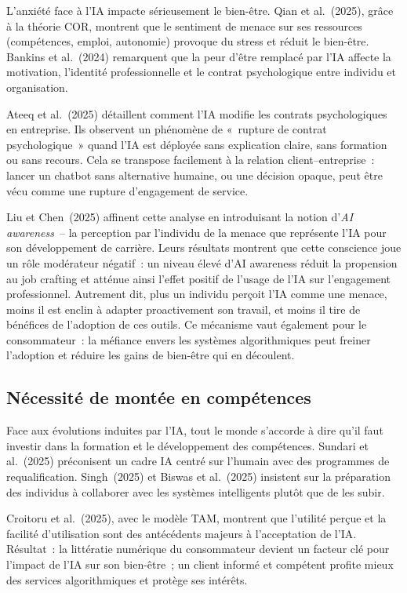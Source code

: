 \documentclass[12pt,a4paper]{article}
\begin{document}
L'anxiété face à l'IA impacte sérieusement le bien-être. Qian et al.~(2025), grâce à la
théorie COR, montrent que le sentiment de menace sur ses ressources (compétences, emploi,
autonomie) provoque du stress et réduit le bien-être. Bankins et al.~(2024) remarquent
que la peur d'être remplacé par l'IA affecte la motivation, l'identité professionnelle et le
contrat psychologique entre individu et organisation.

Ateeq et al.~(2025) détaillent comment l'IA modifie les contrats psychologiques en
entreprise. Ils observent un phénomène de «~rupture de contrat psychologique~» quand
l'IA est déployée sans explication claire, sans formation ou sans recours. Cela se transpose
facilement à la relation client--entreprise~: lancer un chatbot sans alternative humaine, ou
une décision opaque, peut être vécu comme une rupture d'engagement de service.

Liu et Chen~(2025) affinent cette analyse en introduisant la notion d'\emph{AI awareness}~--
la perception par l'individu de la menace que représente l'IA pour son développement de
carrière. Leurs résultats montrent que cette conscience joue un rôle modérateur négatif~:
un niveau élevé d'AI awareness réduit la propension au job crafting et atténue ainsi
l'effet positif de l'usage de l'IA sur l'engagement professionnel. Autrement dit, plus un
individu perçoit l'IA comme une menace, moins il est enclin à adapter proactivement son
travail, et moins il tire de bénéfices de l'adoption de ces outils. Ce mécanisme vaut
également pour le consommateur~: la méfiance envers les systèmes algorithmiques peut
freiner l'adoption et réduire les gains de bien-être qui en découlent.

\subsection{Nécessité de montée en compétences}

Face aux évolutions induites par l'IA, tout le monde s'accorde à dire qu'il faut investir
dans la formation et le développement des compétences. Sundari et al.~(2025) préconisent
un cadre IA centré sur l'humain avec des programmes de requalification. Singh~(2025) et
Biswas et al.~(2025) insistent sur la préparation des individus à collaborer avec les systèmes
intelligents plutôt que de les subir.

Croitoru et al.~(2025), avec le modèle TAM, montrent que l'utilité perçue et la facilité
d'utilisation sont des antécédents majeurs à l'acceptation de l'IA. Résultat~: la littératie
numérique du consommateur devient un facteur clé pour l'impact de l'IA sur son bien-être~;
un client informé et compétent profite mieux des services algorithmiques et protège ses
intérêts.
\end{document}
